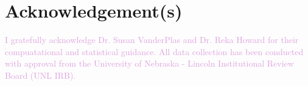 \documentclass[]{interact}
\theoremstyle{plain}%
\theoremstyle{definition}
\theoremstyle{remark}
\begin{document}
\hypertarget{acknowledgements}{%
\section*{Acknowledgement(s)}\label{acknowledgements}}

\textcolor{Plum}{I gratefully acknowledge Dr. Susan VanderPlas and Dr. Reka Howard for their compuatational and statistical guidance. All data collection has been conducted with approval from the University of Nebraska - Lincoln Institutional Review Board (UNL IRB).}



\end{document}
